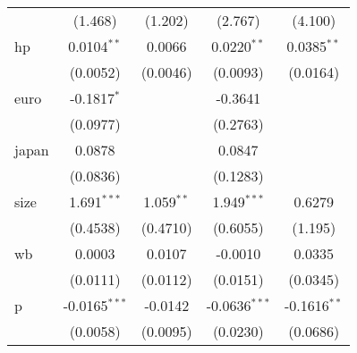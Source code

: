 \begin{tabular}{lcccc}
                                               & (1.468)                                     & (1.202)                & (2.767)               & (4.100)               \\
   hp                                          & 0.0104$^{**}$                               & 0.0066                 & 0.0220$^{**}$         & 0.0385$^{**}$         \\
                                               & (0.0052)                                    & (0.0046)               & (0.0093)              & (0.0164)              \\
   euro                                        & -0.1817$^{*}$                               &                        & -0.3641               &                       \\
                                               & (0.0977)                                    &                        & (0.2763)              &                       \\
   japan                                       & 0.0878                                      &                        & 0.0847                &                       \\
                                               & (0.0836)                                    &                        & (0.1283)              &                       \\
   size                                        & 1.691$^{***}$                               & 1.059$^{**}$           & 1.949$^{***}$         & 0.6279                \\
                                               & (0.4538)                                    & (0.4710)               & (0.6055)              & (1.195)               \\
   wb                                          & 0.0003                                      & 0.0107                 & -0.0010               & 0.0335                \\
                                               & (0.0111)                                    & (0.0112)               & (0.0151)              & (0.0345)              \\
   p                                           & -0.0165$^{***}$                             & -0.0142                & -0.0636$^{***}$       & -0.1616$^{**}$        \\
                                               & (0.0058)                                    & (0.0095)               & (0.0230)              & (0.0686)              \\

\end{tabular}
